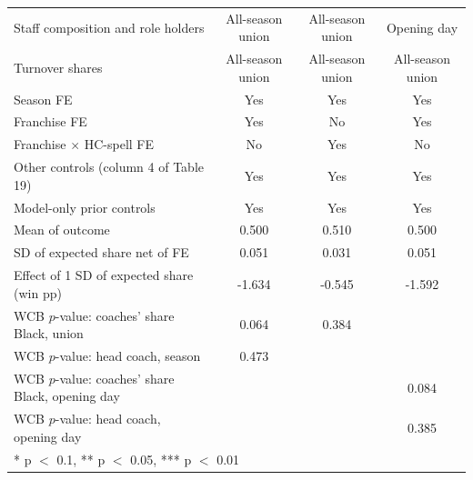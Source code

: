 \begin{table}[H]
{\begin{tabular}[t]{lccc}
Staff composition and role holders & All-season union & All-season union & Opening day\\
Turnover shares & All-season union & All-season union & All-season union\\
Season FE & Yes & Yes & Yes\\
Franchise FE & Yes & No & Yes\\
Franchise $\times$ HC-spell FE & No & Yes & No\\
Other controls (column 4 of Table 19) & Yes & Yes & Yes\\
Model-only prior controls & Yes & Yes & Yes\\
Mean of outcome & 0.500 & 0.510 & 0.500\\
SD of expected share net of FE & 0.051 & 0.031 & 0.051\\
Effect of 1 SD of expected share (win pp) & -1.634 & -0.545 & -1.592\\
WCB $p$-value: coaches' share Black, union & 0.064 & 0.384 & \\
WCB $p$-value: head coach, season & 0.473 &  & \\
WCB $p$-value: coaches' share Black, opening day &  &  & 0.084\\
WCB $p$-value: head coach, opening day &  &  & 0.385\\
\bottomrule
\multicolumn{4}{l}{\rule{0pt}{1em}* p $<$ 0.1, ** p $<$ 0.05, *** p $<$ 0.01}\\
\end{tabular}}
\end{table}

